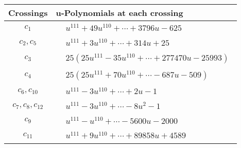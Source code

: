 \documentclass[1p]{elsarticle_modified}
\theoremstyle{definition}
\begin{document}
\begin{tabular}{m{50pt}|m{274pt}}
Crossings & \hspace{64pt}u-Polynomials at each crossing \\
\hline $$\begin{aligned}c_{1}\end{aligned}$$&$\begin{aligned}
&u^{111}+49 u^{110}+\cdots+3796 u-625
\end{aligned}$\\
\hline $$\begin{aligned}c_{2},c_{5}\end{aligned}$$&$\begin{aligned}
&u^{111}+3 u^{110}+\cdots+314 u+25
\end{aligned}$\\
\hline $$\begin{aligned}c_{3}\end{aligned}$$&$\begin{aligned}
&25(25 u^{111}-35 u^{110}+\cdots+277470 u-25993)
\end{aligned}$\\
\hline $$\begin{aligned}c_{4}\end{aligned}$$&$\begin{aligned}
&25(25 u^{111}+70 u^{110}+\cdots-687 u-509)
\end{aligned}$\\
\hline $$\begin{aligned}c_{6},c_{10}\end{aligned}$$&$\begin{aligned}
&u^{111}-3 u^{110}+\cdots+2 u-1
\end{aligned}$\\
\hline $$\begin{aligned}c_{7},c_{8},c_{12}\end{aligned}$$&$\begin{aligned}
&u^{111}-3 u^{110}+\cdots-8 u^2-1
\end{aligned}$\\
\hline $$\begin{aligned}c_{9}\end{aligned}$$&$\begin{aligned}
&u^{111}- u^{110}+\cdots-5600 u-2000
\end{aligned}$\\
\hline $$\begin{aligned}c_{11}\end{aligned}$$&$\begin{aligned}
&u^{111}+9 u^{110}+\cdots+89858 u+4589
\end{aligned}$\\
\hline
\end{tabular}\\~\\
\end{document}
